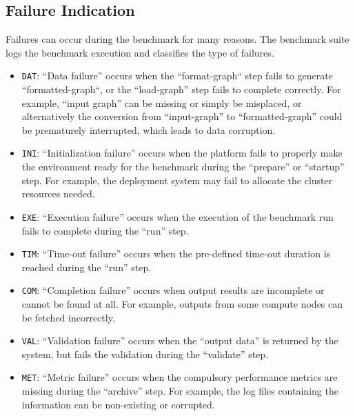 \subsection{Failure Indication}
\label{sec:process:execution:failure}
Failures can occur during the benchmark for many reasons. The benchmark suite logs the benchmark execution and classifies the type of failures.


\begin{itemize}
    \item \texttt{DAT}: ``Data failure'' occurs when the ``format-graph`` step fails to generate ``formatted-graph``, or the ``load-graph'' step fails to complete correctly. For example, ``input graph'' can be missing or simply be misplaced, or alternatively the conversion from ``input-graph'' to ``formatted-graph'' could be prematurely interrupted, which leads to data corruption.
    
    \item \texttt{INI}: ``Initialization failure'' occurs when the platform fails to properly make the environment ready for the benchmark during the ``prepare'' or ``startup'' step. For example, the deployment system may fail to allocate the cluster resources needed.
    
    \item \texttt{EXE}: ``Execution failure'' occurs when the execution of the benchmark run fails to complete during the ``run'' step.
    
    \item \texttt{TIM}: ``Time-out failure'' occurs when the pre-defined time-out duration is reached during the ``run'' step.

    \item \texttt{COM}: ``Completion failure'' occurs when output results are incomplete or cannot be found at all. For example, outputs from some compute nodes can be fetched incorrectly.
    
    \item \texttt{VAL}: ``Validation failure'' occurs when the ``output data'' is returned by the system, but fails the validation during the ``validate'' step.
    
    \item \texttt{MET}: ``Metric failure'' occurs when the compulsory performance metrics are missing during the ``archive'' step. For example, the log files containing the information can be non-existing or corrupted.
\end{itemize}










